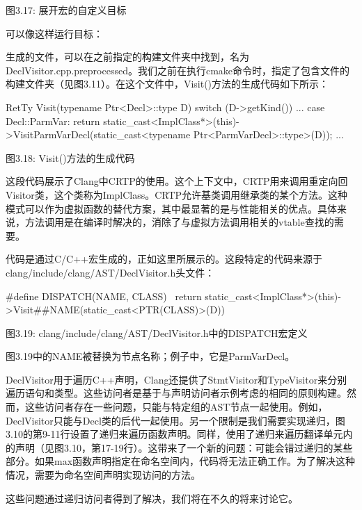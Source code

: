 \begin{center}
图3.17: 展开宏的自定义目标
\end{center}

可以像这样运行目标：


生成的文件，可以在之前指定的构建文件夹中找到，名为DeclVisitor.cpp.preprocessed。我们之前在执行cmake命令时，指定了包含文件的构建文件夹（见图3.11）。在这个文件中，Visit()方法的生成代码如下所示：

\begin{cpp}
RetTy Visit(typename Ptr<Decl>::type D) {
  switch (D->getKind()) {
  ...
  case Decl::ParmVar: return static_cast<ImplClass*>(this)->VisitParmVarDecl(static_cast<typename Ptr<ParmVarDecl>::type>(D));
  ...
  }
}
\end{cpp}

\begin{center}
图3.18: Visit()方法的生成代码
\end{center}

这段代码展示了Clang中CRTP的使用。这个上下文中，CRTP用来调用重定向回Visitor类，这个类称为ImplClass。CRTP允许基类调用继承类的某个方法。这种模式可以作为虚拟函数的替代方案，其中最显著的是与性能相关的优点。具体来说，方法调用是在编译时解决的，消除了与虚拟方法调用相关的vtable查找的需要。

代码是通过C/C++宏生成的，正如这里所展示的。这段特定的代码来源于clang/include/clang/AST/DeclVisitor.h头文件：

\begin{cpp}
#define DISPATCH(NAME, CLASS) \
  return static_cast<ImplClass*>(this)->Visit##NAME(static_cast<PTR(CLASS)>(D))
\end{cpp}

\begin{center}
图3.19: clang/include/clang/AST/DeclVisitor.h中的DISPATCH宏定义
\end{center}

图3.19中的NAME被替换为节点名称；例子中，它是ParmVarDecl。

DeclVisitor用于遍历C++声明，Clang还提供了StmtVisitor和TypeVisitor来分别遍历语句和类型。这些访问者是基于与声明访问者示例考虑的相同的原则构建。然而，这些访问者存在一些问题，只能与特定组的AST节点一起使用。例如，DeclVisitor只能与Decl类的后代一起使用。另一个限制是我们需要实现递归，图3.10的第9-11行设置了递归来遍历函数声明。同样，使用了递归来遍历翻译单元内的声明（见图3.10，第17-19行）。这带来了一个新的问题：可能会错过递归的某些部分。如果max函数声明指定在命名空间内，代码将无法正确工作。为了解决这种情况，需要为命名空间声明实现访问的方法。

这些问题通过递归访问者得到了解决，我们将在不久的将来讨论它。


















